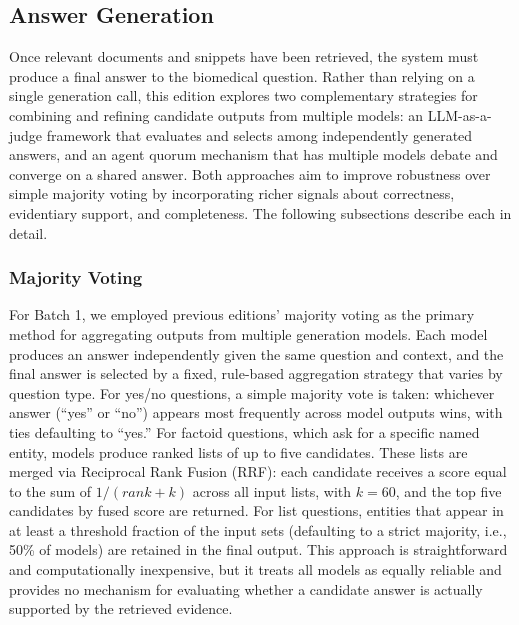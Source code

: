 
\subsection{Answer Generation}

Once relevant documents and snippets have been retrieved, the system must produce a final answer to the biomedical question. Rather than relying on a single generation call, this edition explores two complementary strategies for combining and refining candidate outputs from multiple models: an LLM-as-a-judge framework that evaluates and selects among independently generated answers, and an agent quorum mechanism that has multiple models debate and converge on a shared answer. Both approaches aim to improve robustness over simple majority voting by incorporating richer signals about correctness, evidentiary support, and completeness. The following subsections describe each in detail.

\subsubsection{Majority Voting}

For Batch 1, we employed previous editions' majority voting as the primary method for aggregating outputs from multiple generation models. Each model produces an answer independently given the same question and context, and the final answer is selected by a fixed, rule-based aggregation strategy that varies by question type. For yes/no questions, a simple majority vote is taken: whichever answer (``yes'' or ``no'') appears most frequently across model outputs wins, with ties defaulting to ``yes.'' For factoid questions, which ask for a specific named entity, models produce ranked lists of up to five candidates. These lists are merged via Reciprocal Rank Fusion (RRF): each candidate receives a score equal to the sum of $1 / (rank + k)$ across all input lists, with $k = 60$, and the top five candidates by fused score are returned. For list questions, entities that appear in at least a threshold fraction of the input sets (defaulting to a strict majority, i.e., 50\% of models) are retained in the final output. This approach is straightforward and computationally inexpensive, but it treats all models as equally reliable and provides no mechanism for evaluating whether a candidate answer is actually supported by the retrieved evidence.


